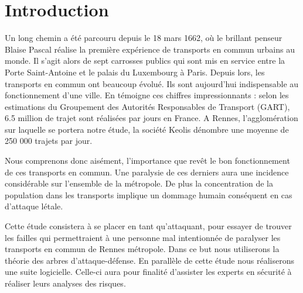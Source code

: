 \section{Introduction}
    Un long chemin a été parcouru depuis le 18 mars 1662, où le brillant penseur Blaise Pascal réalise la première expérience de transports en commun urbains au monde. Il s'agit alors de sept carrosses publics qui sont mis en service entre la Porte Saint-Antoine et le palais du Luxembourg à Paris. Depuis lors, les transports en commun ont beaucoup évolué. Ils sont aujourd'hui indispensable au fonctionnement d'une ville. En témoigne ces chiffres impressionnants : selon les estimations du Groupement des Autorités Responsables de Transport (GART), 6.5 million de trajet sont réalisées par jours en France. A Rennes, l'agglomération sur laquelle se portera notre étude, la société Keolis dénombre une moyenne de 250 000 trajets par jour. 

    Nous comprenons donc aisément, l'importance que revêt le bon fonctionnement de ces transports en commun. Une paralysie de ces derniers aura une incidence considérable sur l'ensemble de la métropole.  De plus la concentration de la population dans les transports implique un dommage humain conséquent en cas d'attaque létale.

    Cette étude consistera à se placer en tant qu'attaquant, pour essayer de trouver les failles qui permettraient à une personne mal intentionnée de paralyser les transports en commun de Rennes métropole. 
    Dans ce but nous utiliserons la théorie des arbres d'attaque-défense. 
    En parallèle de cette étude nous réaliserons une suite logicielle. Celle-ci aura pour finalité d'assister les experts en sécurité à réaliser leurs analyses des risques.
